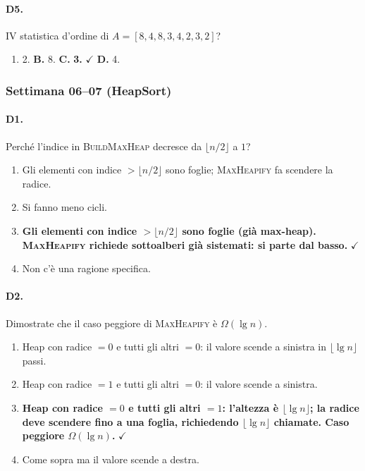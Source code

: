 \paragraph{D5.} IV statistica d'ordine di $A=[8,4,8,3,4,2,3,2]$?
\begin{enumerate}[label=\Alph*.,leftmargin=*]
	\item 2. \quad\textbf{B.} 8. \quad\textbf{C.} \textcolor{correctgreen}{\textbf{3.}} \hfill\textcolor{correctgreen}{$\checkmark$} \quad\textbf{D.} 4.
\end{enumerate}

\subsubsection{Settimana 06--07 (HeapSort)}

\paragraph{D1.} Perch\'e l'indice in \textsc{BuildMaxHeap} decresce da $\lfloor n/2\rfloor$ a $1$?
\begin{enumerate}[label=\Alph*.,leftmargin=*]
	\item Gli elementi con indice $> \lfloor n/2\rfloor$ sono foglie; \textsc{MaxHeapify} fa scendere la radice.
	\item Si fanno meno cicli.
	\item \textcolor{correctgreen}{\textbf{Gli elementi con indice $> \lfloor n/2\rfloor$ sono foglie (gi\`a max-heap). \textsc{MaxHeapify} richiede sottoalberi gi\`a sistemati: si parte dal basso.}} \hfill\textcolor{correctgreen}{$\checkmark$}
	\item Non c'\`e una ragione specifica.
\end{enumerate}

\paragraph{D2.} Dimostrate che il caso peggiore di \textsc{MaxHeapify} \`e $\Omega(\lg n)$.
\begin{enumerate}[label=\Alph*.,leftmargin=*]
	\item Heap con radice $=0$ e tutti gli altri $=0$: il valore scende a sinistra in $\lfloor\lg n\rfloor$ passi.
	\item Heap con radice $=1$ e tutti gli altri $=0$: il valore scende a sinistra.
	\item \textcolor{correctgreen}{\textbf{Heap con radice $=0$ e tutti gli altri $=1$: l'altezza \`e $\lfloor\lg n\rfloor$; la radice deve scendere fino a una foglia, richiedendo $\lfloor\lg n\rfloor$ chiamate. Caso peggiore $\Omega(\lg n)$.}} \hfill\textcolor{correctgreen}{$\checkmark$}
	\item Come sopra ma il valore scende a destra.
\end{enumerate}

